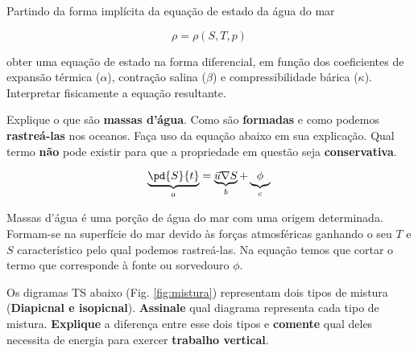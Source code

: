 \begin{questions}
  Partindo da forma implícita da equação de estado da água do mar

  \[
    \rho  =  \rho(S, T, p)
  \]

  obter uma equação de estado na forma diferencial, em função dos coeficientes
  de expansão térmica ($\alpha$), contração salina ($\beta$) e compressibilidade
  bárica ($\kappa$).  Interpretar fisicamente a equação resultante.
\end{questions}

\begin{questions}
\end{questions}



\question[5]
Explique o que são {\bf massas d'água}.  Como são {\bf formadas} e como podemos
{\bf rastreá-las} nos oceanos.  Faça uso da equação abaixo em sua explicação.
Qual termo {\bf não} pode existir para que a propriedade em questão seja
{\bf conservativa}.

\[
  \underbrace{\pd{S}{t}}_a = \underbrace{\vec{u}\nabla S}_b + \underbrace{\phi}_c
\]

\begin{solution}
 Massas d'água é uma porção de água do mar com uma origem determinada.
 Formam-se na superfície do mar devido às forças atmosféricas ganhando o seu $T$
 e $S$ característico pelo qual podemos rastreá-las.  Na equação temos que
 cortar o termo que corresponde à fonte ou sorvedouro $\phi$.
\end{solution}


\question[3]
Os digramas TS abaixo (Fig. \ref{fig:mistura}) representam dois tipos de mistura
({\bf Diapicnal e isopicnal}). {\bf Assinale} qual diagrama representa cada tipo
de mistura.  {\bf Explique} a diferença entre esse dois tipos e {\bf comente}
qual deles necessita de energia para exercer {\bf trabalho vertical}.

